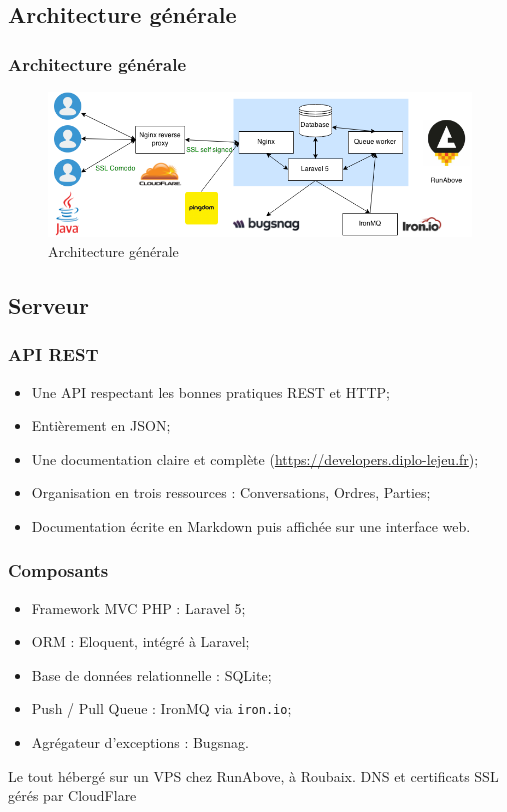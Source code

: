 \subsection{Architecture générale}
	\begin{frame}
		\frametitle{Architecture générale}
		\begin{figure}
			\centering
			\includegraphics[width=1\textwidth]{images/architecture.png}
			\caption{Architecture générale}
			\label{fig:qualite-ssl}
		\end{figure}
	\end{frame}

\subsection{Serveur}
	\begin{frame}
		\frametitle{API REST}
		\begin{itemize}
			\item Une API respectant les bonnes pratiques REST et HTTP;
			\item Entièrement en JSON;
			\item Une documentation claire et complète (\url{https://developers.diplo-lejeu.fr});
			\item Organisation en trois ressources : Conversations, Ordres, Parties;
			\item Documentation écrite en Markdown puis affichée sur une interface web.
		\end{itemize}
	\end{frame}

	\begin{frame}
		\frametitle{Composants}
		\begin{itemize}
			\item Framework MVC PHP : Laravel 5;
			\item ORM : Eloquent, intégré à Laravel;
			\item Base de données relationnelle : SQLite;
			\item Push / Pull Queue : IronMQ via \texttt{iron.io};
			\item Agrégateur d'exceptions : Bugsnag.
		\end{itemize}\bigskip
		Le tout hébergé sur un VPS chez RunAbove, à Roubaix. DNS et certificats SSL gérés par CloudFlare
	\end{frame}

